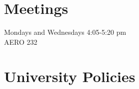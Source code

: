 \documentclass[9pt]{article}
\begin{document}
\section*{Meetings}

Mondays and Wednesdays 4:05-5:20 pm\\
AERO 232

\section*{University Policies}

\begin{description}

\end{description}
\end{document}

